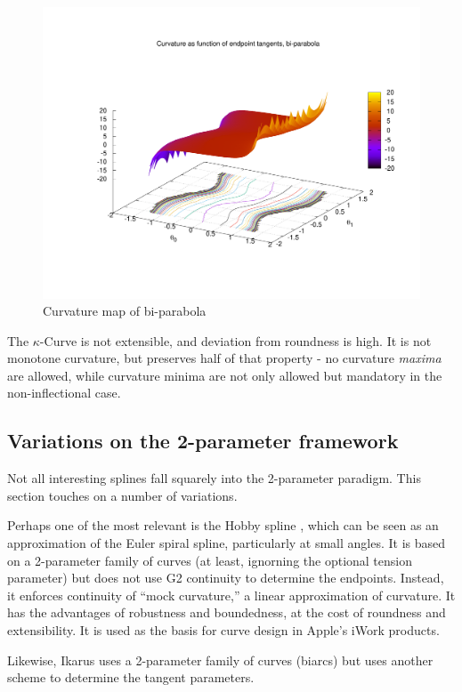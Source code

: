 \documentclass{article}
\newcommand{\kcurve}{$\kappa$-Curve}
\begin{document}
\begin{figure}
\centering
\includegraphics[scale=0.5]{biparab_kmap}
\caption{Curvature map of bi-parabola}
\label{biparab_kmap}
\end{figure}

The \kcurve{} is not extensible, and deviation from roundness is high. It is not monotone curvature, but preserves half of that property - no curvature \emph{maxima} are allowed, while curvature minima are not only allowed but mandatory in the non-inflectional case.

\subsection{Variations on the 2-parameter framework}

Not all interesting splines fall squarely into the 2-parameter paradigm. This section touches on a number of variations.

Perhaps one of the most relevant is the Hobby spline \cite{Hobby85}, which can be seen as an approximation of the Euler spiral spline, particularly at small angles. It is based on a 2-parameter family of curves (at least, ignorning the optional tension parameter) but does not use G2 continuity to determine the endpoints. Instead, it enforces continuity of ``mock curvature,'' a linear approximation of curvature. It has the advantages of robustness and boundedness, at the cost of roundness and extensibility. It is used as the basis for curve design in Apple's iWork products.

Likewise, Ikarus \cite{Karow87} uses a 2-parameter family of curves (biarcs) but uses another scheme to determine the tangent parameters.
\end{document}

